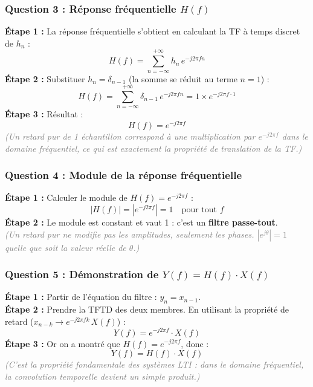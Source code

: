 \documentclass[12pt,a4paper]{article}
\newcommand{\step}[1]{\textcolor{coursbleu}{\textbf{Étape #1 :}}}
\newcommand{\explication}[1]{\textit{\textcolor{gray}{(#1)}}}
\newcommand{\encadre}[1]{\boxed{#1}}
\begin{document}
\subsubsection*{Question 3 : Réponse fréquentielle $H(f)$}

\begin{tcolorbox}[corrbox, title=Correction Q3]
\step{1} La réponse fréquentielle s'obtient en calculant la TF à temps discret de $h_n$ :
\[
  H(f) = \sum_{n=-\infty}^{+\infty} h_n\,e^{-j2\pi fn}
\]
\step{2} Substituer $h_n = \delta_{n-1}$ (la somme se réduit au terme $n=1$) :
\[
  H(f) = \sum_{n=-\infty}^{+\infty} \delta_{n-1}\,e^{-j2\pi fn}
       = 1 \times e^{-j2\pi f \cdot 1}
\]
\step{3} Résultat :
\[
  \encadre{H(f) = e^{-j2\pi f}}
\]
\explication{Un retard pur de 1 échantillon correspond à une multiplication par $e^{-j2\pi f}$
dans le domaine fréquentiel, ce qui est exactement la propriété de translation de la TF.}
\end{tcolorbox}

\subsubsection*{Question 4 : Module de la réponse fréquentielle}

\begin{tcolorbox}[corrbox, title=Correction Q4]
\step{1} Calculer le module de $H(f) = e^{-j2\pi f}$ :
\[
  |H(f)| = |e^{-j2\pi f}| = 1 \quad \text{pour tout } f
\]
\step{2} Le module est constant et vaut 1 : c'est un \textbf{filtre passe-tout}.\\[3pt]
\explication{Un retard pur ne modifie pas les amplitudes, seulement les phases.
$|e^{j\theta}| = 1$ quelle que soit la valeur réelle de $\theta$.}
\end{tcolorbox}

\subsubsection*{Question 5 : Démonstration de $Y(f) = H(f)\cdot X(f)$}

\begin{tcolorbox}[corrbox, title=Correction Q5]
\step{1} Partir de l'équation du filtre : $y_n = x_{n-1}$.\\[4pt]
\step{2} Prendre la TFTD des deux membres. En utilisant la propriété de retard ($x_{n-k} \to e^{-j2\pi fk}\,X(f)$) :
\[
  Y(f) = e^{-j2\pi f}\cdot X(f)
\]
\step{3} Or on a montré que $H(f) = e^{-j2\pi f}$, donc :
\[
  \encadre{Y(f) = H(f)\cdot X(f)}
\]
\explication{C'est la propriété fondamentale des systèmes LTI : dans le domaine fréquentiel,
la convolution temporelle devient un simple produit.}
\end{tcolorbox}
\end{document}
